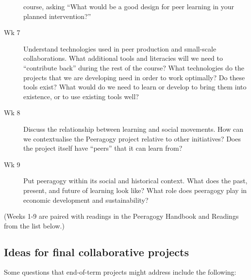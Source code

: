 \begin{description}
course, asking ``What would be a good design for peer learning in your
planned intervention?''
\item[Wk 7]
Understand technologies used in peer production and small-scale
collaborations. What additional tools and literacies will we need to
``contribute back'' during the rest of the course? What technologies do
the projects that we are developing need in order to work optimally? Do
these tools exist? What would do we need to learn or develop to bring
them into existence, or to use existing tools well?
\item[Wk 8]
Discuss the relationship between learning and social movements. How can
we contextualise the Peeragogy project relative to other initiatives?
Does the project itself have ``peers'' that it can learn from?
\item[Wk 9]
Put peeragogy within its social and historical context. What does the
past, present, and future of learning look like? What role does
peeragogy play in economic development and sustainability?
\end{description}

(Weeks 1-9 are paired with readings in the Peeragogy Handbook and
Readings from the list below.)

\hypertarget{ideas-for-final-collaborative-projects}{%
\subsection{Ideas for final collaborative
projects}\label{ideas-for-final-collaborative-projects}}

Some questions that end-of-term projects might address include the
following:

